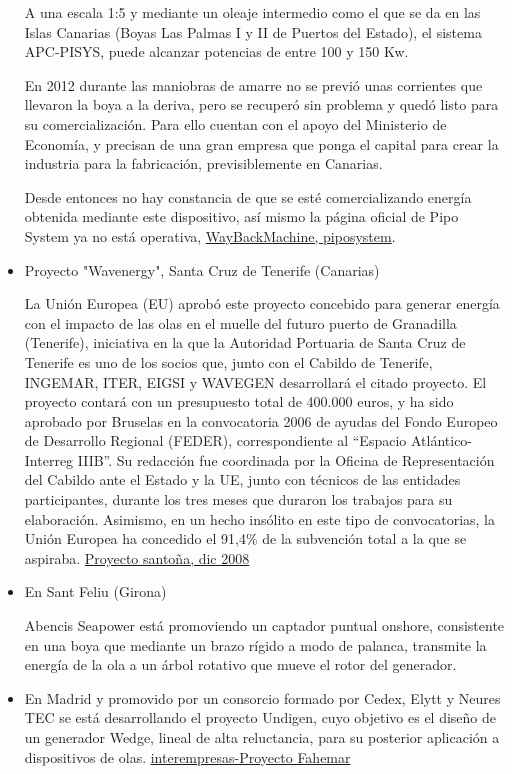 \documentclass[]{article}
\begin{document}
\begin{itemize}
  A una escala 1:5 y mediante un oleaje intermedio como el que se da en
  las Islas Canarias (Boyas Las Palmas I y II de Puertos del Estado), el
  sistema APC-PISYS, puede alcanzar potencias de entre 100 y 150 Kw.

  En 2012 durante las maniobras de amarre no se previó unas corrientes
  que llevaron la boya a la deriva, pero se recuperó sin problema y
  quedó listo para su comercialización. Para ello cuentan con el apoyo
  del Ministerio de Economía, y precisan de una gran empresa que ponga
  el capital para crear la industria para la fabricación,
  previsiblemente en Canarias.

  Desde entonces no hay constancia de que se esté comercializando
  energía obtenida mediante este dispositivo, así mismo la página
  oficial de Pipo System ya no está operativa,
  \href{https://web.archive.org/web/20170427103046/http://www.piposystems.com/welcome.html}{WayBackMachine,
  piposystem}.
\item
  Proyecto "Wavenergy", Santa Cruz de Tenerife (Canarias)

  La Unión Europea (EU) aprobó este proyecto concebido para generar
  energía con el impacto de las olas en el muelle del futuro puerto de
  Granadilla (Tenerife), iniciativa en la que la Autoridad Portuaria de
  Santa Cruz de Tenerife es uno de los socios que, junto con el Cabildo
  de Tenerife, INGEMAR, ITER, EIGSI y WAVEGEN desarrollará el citado
  proyecto. El proyecto contará con un presupuesto total de 400.000
  euros, y ha sido aprobado por Bruselas en la convocatoria 2006 de
  ayudas del Fondo Europeo de Desarrollo Regional (FEDER),
  correspondiente al ``Espacio Atlántico-Interreg IIIB''. Su redacción
  fue coordinada por la Oficina de Representación del Cabildo ante el
  Estado y la UE, junto con técnicos de las entidades participantes,
  durante los tres meses que duraron los trabajos para su elaboración.
  Asimismo, en un hecho insólito en este tipo de convocatorias, la Unión
  Europea ha concedido el 91,4\% de la subvención total a la que se
  aspiraba.
  \href{http://www.mapama.gob.es/ministerio/pags/Biblioteca/Revistas/pdf_AM\%2FAM_2008_83_26_31\%5B1\%5D.pdf}{Proyecto
  santoña, dic 2008}
\item
  En Sant Feliu (Girona)

  Abencis Seapower está promoviendo un captador puntual onshore,
  consistente en una boya que mediante un brazo rígido a modo de
  palanca, transmite la energía de la ola a un árbol rotativo que mueve
  el rotor del generador.
\item
  En Madrid y promovido por un consorcio formado por Cedex, Elytt y
  Neures TEC se está desarrollando el proyecto Undigen, cuyo objetivo es
  el diseño de un generador Wedge, lineal de alta reluctancia, para su
  posterior aplicación a dispositivos de olas.
  \href{http://www.interempresas.net/Energia/Articulos/126331-Generar-energia-a-partir-de-energia-undimotriz.html}{interempresas-Proyecto
  Fahemar}
\end{itemize}
\end{document}
